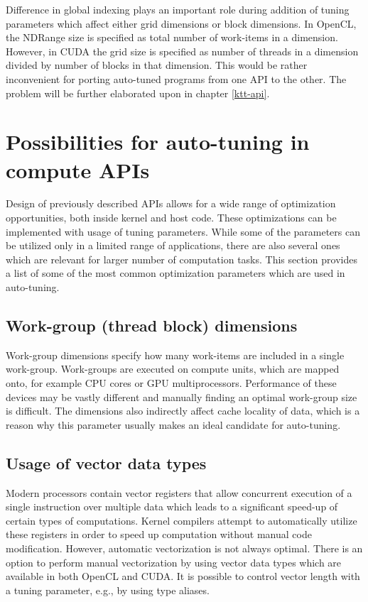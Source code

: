 \documentclass
[
    digital, %
    oneside, %
    table, %
    nolof, %
    nolot, %
    nocover %
]{fithesis3}
\begin{document}
Difference in global indexing plays an important role during addition of tuning parameters which affect either grid dimensions or block dimensions.
In OpenCL, the NDRange size is specified as total number of work-items in a dimension. However, in CUDA the grid size is specified as number of threads
in a dimension divided by number of blocks in that dimension. This would be rather inconvenient for porting auto-tuned programs from one API to the other.
The problem will be further elaborated upon in chapter \ref{ktt-api}.

\section{Possibilities for auto-tuning in compute APIs}
Design of previously described APIs allows for a wide range of optimization opportunities, both inside kernel and host code. These optimizations can
be implemented with usage of tuning parameters. While some of the parameters can be utilized only in a limited range of applications, there are also
several ones which are relevant for larger number of computation tasks. This section provides a list of some of the most common optimization parameters
which are used in auto-tuning.

\subsection{Work-group (thread block) dimensions}
Work-group dimensions specify how many work-items are included in a single work-group. Work-groups are executed on compute units, which are mapped
onto, for example CPU cores or GPU multiprocessors. Performance of these devices may be vastly different and manually finding an optimal work-group
size is difficult. The dimensions also indirectly affect cache locality of data, which is a reason why this parameter usually makes an ideal candidate
for auto-tuning.

\subsection{Usage of vector data types}
Modern processors contain vector registers that allow concurrent execution of a single instruction over multiple data which leads to a significant
speed-up of certain types of computations. Kernel compilers attempt to automatically utilize these registers in order to speed up computation without
manual code modification. However, automatic vectorization is not always optimal. There is an option to perform manual vectorization by using vector
data types which are available in both OpenCL and CUDA. It is possible to control vector length with a tuning parameter, e.g., by using type aliases.
\end{document}
